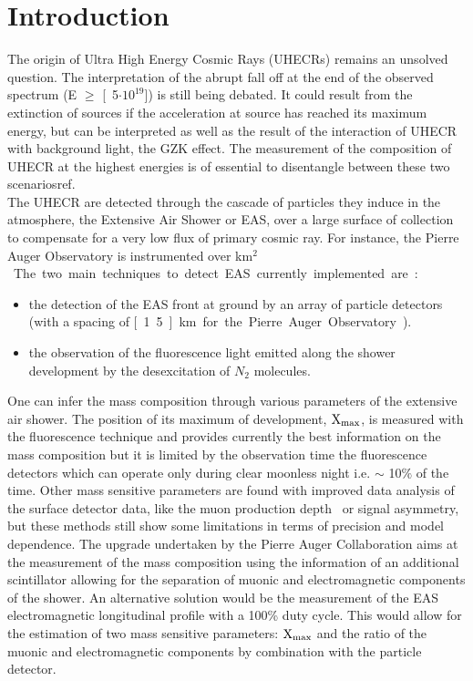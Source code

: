 \section*{Introduction}
The  origin of  Ultra  High  Energy Cosmic  Rays  (UHECRs) remains  an
unsolved question.  The  interpretation of the abrupt fall off  at the end of the           observed           spectrum          (E           $\geq$
\unit[5$\cdot10^{19}$])\cite{Fukushima:2013yea} is still being debated. It could result from the extinction of sources if the acceleration at source has reached its maximum energy, but can be interpreted as well as the result of the interaction of UHECR with background light, the GZK effect. The measurement of the composition of UHECR at the highest energies is of essential to disentangle between these two scenarios{ref}.\\ The UHECR are detected through the cascade of particles they induce in  the atmosphere, the Extensive Air Shower or EAS, over a large surface of collection to compensate for a very low flux of primary cosmic ray. For instance, the Pierre Auger Observatory is instrumented over \unit[3000]{km$^2$}. The two main techniques to detect EAS currently implemented are:
\begin{itemize}
\item  the  detection of  the EAS  front at   ground  by  an  array  of  particle  detectors (with  a  spacing  of   \unit[1.5]{km} for the Pierre Auger Observatory).
\item  the observation  of the  fluorescence light  emitted  along the
  shower development by the desexcitation of $N_2$ molecules.
\end{itemize}
One can infer the mass composition through various parameters of the extensive air shower. The position of its maximum of development, $\rm X_{max}$, is measured with the fluorescence technique and provides currently the best information on the mass composition but it is limited by the observation time the fluorescence detectors which can operate only during clear   moonless   night   i.e.    $\sim$   10$\%$ of the time. Other mass sensitive parameters are found with improved data analysis of the surface detector data, like the muon production depth~\cite{augermassmpd} or signal  asymmetry,  but these methods still show some limitations in terms of precision and model dependence. The upgrade undertaken by the Pierre Auger Collaboration aims at the measurement of the mass composition using the information of an additional scintillator allowing for the separation of muonic and electromagnetic components of the shower. An alternative solution would be the measurement of the EAS electromagnetic longitudinal profile with a 100\% duty cycle. This would allow for the estimation of two mass sensitive parameters: $\rm X_{max}$ and the ratio of the muonic and electromagnetic components by combination with the particle detector.
%


